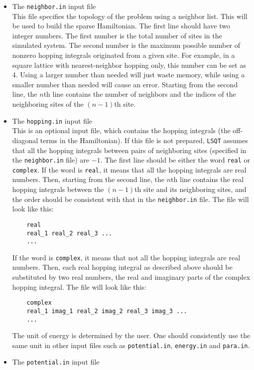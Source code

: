 \documentclass[12pt,a4paper]{report}
\begin{document}
\begin{itemize}
\item The \verb"neighbor.in" input file\\
This file specifies the topology of the problem using a neighbor list. This will be used to build the sparse Hamiltonian. The first line should have two integer numbers. The first number is the total number of sites in the simulated system. The second number is the maximum possible number of nonzero hopping integrals originated from a given site. For example, in a square lattice with nearest-neighbor hopping only, this number can be set as 4. Using a larger number than needed will just waste memory, while using a smaller number than needed will cause an error. Starting from the second line, the $n$th line contains the number of neighbors and the indices of the neighboring sites of the $(n-1)$th site.
\item The \verb"hopping.in" input file\\
This is an optional input file, which contains the hopping integrals (the off-diagonal terms in the Hamiltonian). If this file is not prepared, \verb"LSQT" assumes that all the hopping integrals between pairs of neighboring sites (specified in the \verb"neighbor.in" file) are $-1$. 
The first line should be either the word \verb"real" or \verb"complex".
If the word is \verb"real", it means that all the hopping integrals are real numbers. Then, starting from the second line, the $n$th line contains the real hopping integrals between the $(n-1)$th site and its neighboring sites, and the order should be consistent with that in the \verb"neighbor.in" file. The file will look like this:
\begin{verbatim}
    real
    real_1 real_2 real_3 ...
    ...
\end{verbatim}
If the word is \verb"complex", it means that not all the hopping integrals are real numbers. Then, each real hopping integral as described above should be substituted by two real numbers, the real and imaginary parts of the complex hopping integral. The file will look like this:
\begin{verbatim}
    complex
    real_1 imag_1 real_2 imag_2 real_3 imag_3 ...
    ...
\end{verbatim}
The unit of energy is determined by the user. One should consistently use the same unit in other input files such as \verb"potential.in", \verb"energy.in" and \verb"para.in".
\item The \verb"potential.in" input file\\

\end{itemize}
\end{document}
